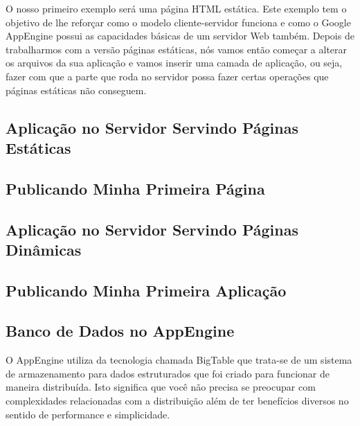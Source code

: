 \documentclass[a4paper]{article}
\begin{document}
O nosso primeiro exemplo será uma página HTML estática. Este exemplo tem o objetivo de lhe reforçar como o modelo cliente-servidor funciona e como o Google AppEngine possui as capacidades básicas de um servidor Web também. Depois de trabalharmos com a versão páginas estáticas, nós vamos então começar a alterar os arquivos da sua aplicação e vamos inserir uma camada de aplicação, ou seja, fazer com que a parte que roda no servidor possa fazer certas operações que páginas estáticas não conseguem. 

\subsection {Aplicação no Servidor Servindo Páginas Estáticas} 


\subsection { Publicando Minha Primeira Página } 


\subsection {Aplicação no Servidor Servindo Páginas Dinâmicas} 


\subsection { Publicando Minha Primeira Aplicação } 



\subsection { Banco de Dados no AppEngine } 

O AppEngine utiliza da tecnologia chamada BigTable \cite{bigtable} que trata-se de um sistema de armazenamento para dados estruturados que foi criado para funcionar de maneira distribuída. Isto significa que você não precisa se preocupar com complexidades relacionadas com a distribuição além de ter benefícios diversos no sentido de performance e simplicidade. 


\printindex



\end{document}
